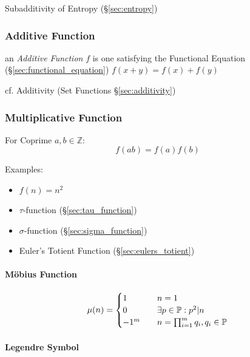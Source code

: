 Subadditivity of Entropy (\S\ref{sec:entropy})



\subsubsection{Additive Function}\label{sec:additive_function}

an \emph{Additive Function} $f$ is one satisfying the Functional Equation
(\S\ref{sec:functional_equation}) $f(x+y) = f(x) + f(y)$

cf. Additivity (Set Functions \S\ref{sec:additivity})



\subsubsection{Multiplicative Function}
\label{sec:multiplicative_function}

For Coprime $a,b \in \mathbb{Z}$:
\[
  f(ab) = f(a)f(b)
\]

Examples:
\begin{itemize}
  \item $f(n) = n^2$
  \item $\tau$-function (\S\ref{sec:tau_function})
  \item $\sigma$-function (\S\ref{sec:sigma_function})
  \item Euler's Totient Function (\S\ref{sec:eulers_totient})
\end{itemize}



\paragraph{M\"obius Function}\label{sec:mobius_function}\hfill

\[
  \mu(n) =
  \begin{cases}
  1     & \quad n = 1 \\
  0     & \quad \exists p \in \mathbb{P} : p^2|n \\
  -1^m  & \quad n = \prod_{i = 1}^m q_i, q_i \in \mathbb{P} \\
  \end{cases}
\]



\paragraph{Legendre Symbol}\label{sec:legendre_symbol}\hfill

